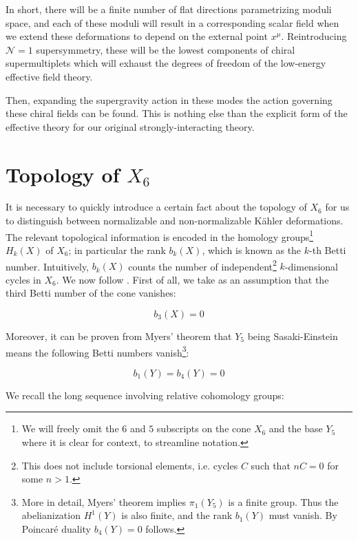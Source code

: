 In short, there will be a finite number of flat directions parametrizing moduli space, and each of these moduli will result in a corresponding scalar field when we extend these deformations to depend on the external point $x^\mu$. Reintroducing $\mathcal{N}=1$ supersymmetry, these will be the lowest components of chiral supermultiplets which will exhaust the degrees of freedom of the low-energy effective field theory.

Then, expanding the supergravity action in these modes the action governing these chiral fields can be found. This is nothing else than the explicit form of the effective theory for our original strongly-interacting theory.

\section{Topology of $X_6$}

It is necessary to quickly introduce a certain fact about the topology of $X_6$ for us to distinguish between normalizable and non-normalizable K\"ahler deformations. The relevant topological information is encoded in the homology groups\footnote{We will freely omit the $6$ and $5$ subscripts on the cone $X_6$ and the base $Y_5$ where it is clear for context, to streamline notation.} $H_k(X)$ of $X_6$; in particular the rank $b_k(X)$, which is known as the $k$-th Betti number. Intuitively, $b_k(X)$ counts the number of independent\footnote{This does not include torsional elements, i.e. cycles $C$ such that $nC=0$ for some $n>1$.} $k$-dimensional cycles in $X_6$. We now follow \cite{Martelli:sbv}. First of all, we take as an assumption that the third Betti number of the cone vanishes:

\begin{equation}
	b_3(X) = 0 \label{bettiX3}
\end{equation}

Moreover, it can be proven \cite{sasakieinstein} from Myers' theorem \cite{myers1941} that $Y_5$ being Sasaki-Einstein means the following Betti numbers vanish\footnote{More in detail, Myers' theorem implies $\pi_1(Y_5)$ is a finite group. Thus the abelianization $H^1(Y)$ is also finite, and the rank $b_1(Y)$ must vanish. By Poincar\'e duality $b_4(Y)=0$ follows.}:

\begin{equation}
	b_1(Y) = b_4(Y) = 0 \label{bettiY14}
\end{equation}

We recall the long sequence involving relative cohomology groups:

